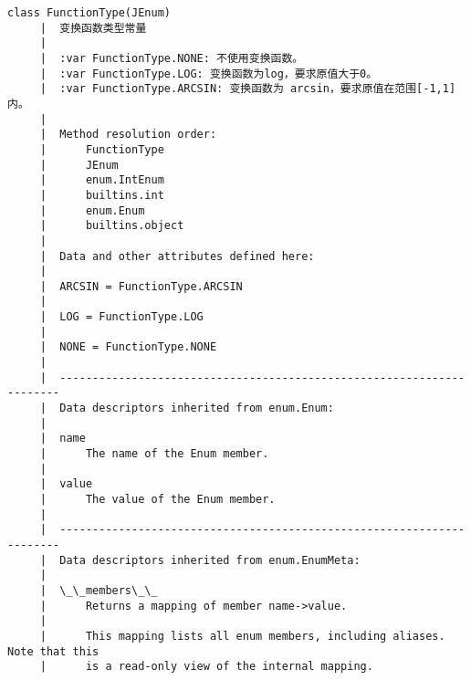 \documentclass[11pt]{article}
\begin{document}
\begin{Verbatim}[commandchars=\\\{\}]
    class FunctionType(JEnum)
     |  变换函数类型常量
     |  
     |  :var FunctionType.NONE: 不使用变换函数。
     |  :var FunctionType.LOG: 变换函数为log，要求原值大于0。
     |  :var FunctionType.ARCSIN: 变换函数为 arcsin，要求原值在范围[-1,1]内。
     |  
     |  Method resolution order:
     |      FunctionType
     |      JEnum
     |      enum.IntEnum
     |      builtins.int
     |      enum.Enum
     |      builtins.object
     |  
     |  Data and other attributes defined here:
     |  
     |  ARCSIN = FunctionType.ARCSIN
     |  
     |  LOG = FunctionType.LOG
     |  
     |  NONE = FunctionType.NONE
     |  
     |  ----------------------------------------------------------------------
     |  Data descriptors inherited from enum.Enum:
     |  
     |  name
     |      The name of the Enum member.
     |  
     |  value
     |      The value of the Enum member.
     |  
     |  ----------------------------------------------------------------------
     |  Data descriptors inherited from enum.EnumMeta:
     |  
     |  \_\_members\_\_
     |      Returns a mapping of member name->value.
     |      
     |      This mapping lists all enum members, including aliases. Note that this
     |      is a read-only view of the internal mapping.
    

\end{Verbatim}
\end{document}
